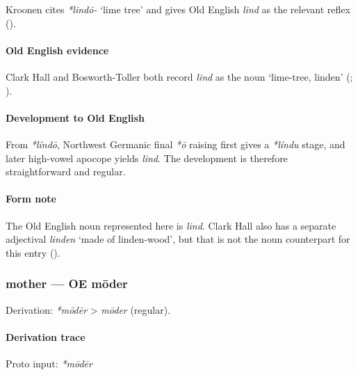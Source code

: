 \documentclass[
  british,
  a4paper,
]{article}
\begin{document}
Kroonen cites \emph{*lindō-} `lime tree' and gives Old English
\emph{lind} as the relevant reflex ().

\paragraph{Old English evidence}\label{old-english-evidence-8}

Clark Hall and Bosworth-Toller both record \emph{lind} as the noun
`lime-tree, linden' (;
).

\paragraph{Development to Old
English}\label{development-to-old-english-8}

From \emph{*líndō}, Northwest Germanic final \emph{*ō} raising first
gives a \emph{*líndu} stage, and later high-vowel apocope yields
\emph{lind}. The development is therefore straightforward and regular.

\paragraph{Form note}\label{form-note}

The Old English noun represented here is \emph{lind}. Clark Hall also
has a separate adjectival \emph{linden} `made of linden-wood', but that
is not the noun counterpart for this entry
().

\subsubsection{mother --- OE mōder}\label{mother-oe-mux14dder}

Derivation: \emph{*mōdēr} \textgreater{} \emph{mōder} (regular).

\paragraph{Derivation trace}\label{derivation-trace-9}

Proto input: \emph{*mōdēr}

\begingroup
\setlength{\fboxsep}{6pt}
\end{document}
